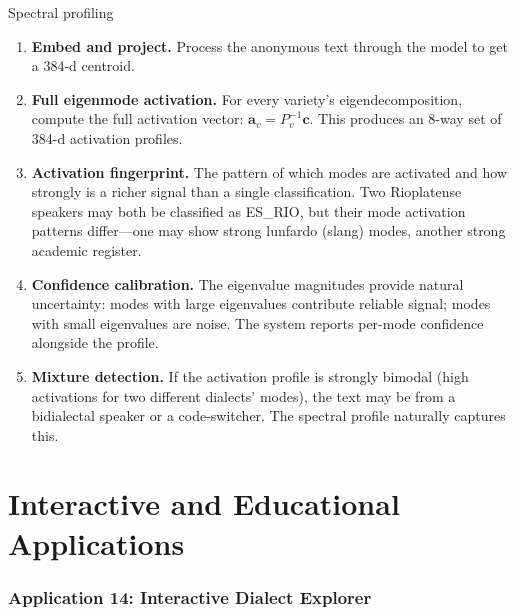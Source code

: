 \documentclass[11pt,a4paper]{article}
\begin{document}
\begin{howbox}{Spectral profiling}
\begin{enumerate}[nosep]
  \item \textbf{Embed and project.} Process the anonymous text
    through the model to get a 384-d centroid.

  \item \textbf{Full eigenmode activation.} For every variety's
    eigendecomposition, compute the full activation vector:
    $\mathbf{a}_v = P_v^{-1} \mathbf{c}$. This produces an 8-way
    set of 384-d activation profiles.

  \item \textbf{Activation fingerprint.} The pattern of which modes
    are activated and how strongly is a richer signal than a single
    classification. Two Rioplatense speakers may both be classified
    as ES\_RIO, but their mode activation patterns differ---one may
    show strong lunfardo (slang) modes, another strong academic register.

  \item \textbf{Confidence calibration.} The eigenvalue magnitudes
    provide natural uncertainty: modes with large eigenvalues
    contribute reliable signal; modes with small eigenvalues are noise.
    The system reports per-mode confidence alongside the profile.

  \item \textbf{Mixture detection.} If the activation profile is
    strongly bimodal (high activations for two different dialects'
    modes), the text may be from a bidialectal speaker or a
    code-switcher. The spectral profile naturally captures this.
\end{enumerate}
\end{howbox}

\part{Interactive and Educational Applications}

\section{Application 14: Interactive Dialect Explorer}
\label{sec:app-explorer}
\end{document}
